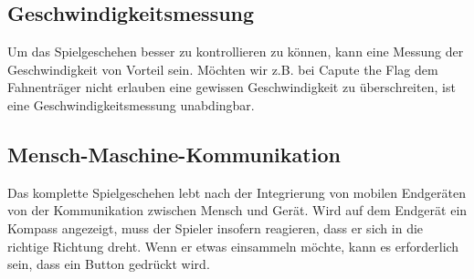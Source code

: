 \documentclass[runningheads,a4paper]{llncs}
\begin{document}
\subsection{Geschwindigkeitsmessung}

Um das Spielgeschehen besser zu kontrollieren zu können, kann eine Messung der
Geschwindigkeit von Vorteil sein. Möchten wir z.B. bei Capute the Flag dem Fahnenträger
nicht erlauben eine gewissen Geschwindigkeit zu überschreiten, ist eine
Geschwindigkeitsmessung unabdingbar.


\subsection{Mensch-Maschine-Kommunikation}

Das komplette Spielgeschehen lebt nach der Integrierung von mobilen Endgeräten von der Kommunikation zwischen Mensch und Gerät. Wird auf dem Endgerät ein Kompass angezeigt, muss der Spieler insofern reagieren, dass er sich in die richtige Richtung dreht.
Wenn er etwas einsammeln möchte, kann es erforderlich sein, dass ein Button gedrückt
wird.
\end{document}
